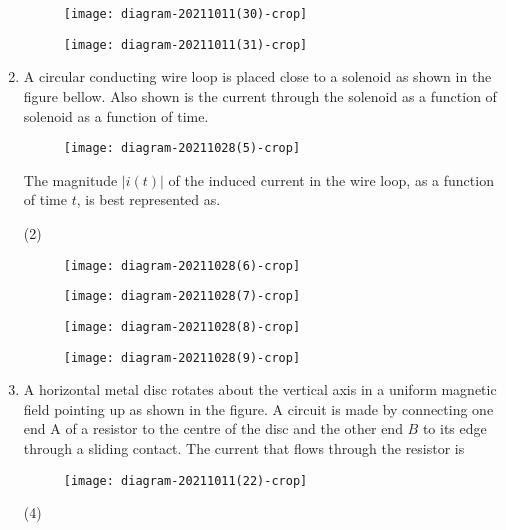\begin{enumerate}
\begin{tasks}
\begin{figure}[H]
			\centering
			\texttt{[image: diagram-20211011(30)-crop]}
		\end{figure}
		\task[\textbf{D.}] \begin{figure}[H]
			\centering
			\texttt{[image: diagram-20211011(31)-crop]}
		\end{figure}
	\end{tasks}
	\item A circular conducting wire loop is placed close to a solenoid as shown in the figure bellow. Also shown is the current through the solenoid as a function of solenoid as a function of time.\\
	\begin{figure}[H]
		\centering
		\texttt{[image: diagram-20211028(5)-crop]}
	\end{figure}
	The magnitude $|i(t)|$ of the induced current in the wire loop, as a function of time $t$, is best represented as.
	{}
	\begin{tasks}(2)
		\task[\textbf{A.}] \begin{figure}[H]
			\centering
			\texttt{[image: diagram-20211028(6)-crop]}
		\end{figure}
		\task[\textbf{B.}] \begin{figure}[H]
			\centering
			\texttt{[image: diagram-20211028(7)-crop]}
		\end{figure}
		\task[\textbf{C.}] \begin{figure}[H]
			\centering
			\texttt{[image: diagram-20211028(8)-crop]}
		\end{figure}
		\task[\textbf{D.}] \begin{figure}[H]
			\centering
			\texttt{[image: diagram-20211028(9)-crop]}
		\end{figure}
	\end{tasks}
	\item A horizontal metal disc rotates about the vertical axis in a uniform magnetic field pointing up as shown in the figure. A circuit is made by connecting one end A of a resistor to the centre of the disc and the other end $B$ to its edge through a sliding contact. The current that flows through the resistor is
	{}
	\begin{figure}[H]
		\centering
		\texttt{[image: diagram-20211011(22)-crop]}
	\end{figure}
	\begin{tasks}(4)

\end{tasks}
\end{enumerate}
